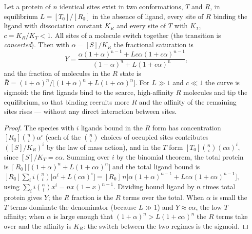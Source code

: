 \begin{theorem}\label{thm:b3:structural-biology:mwc}
Let a protein of $n$ identical sites exist in two conformations,
$T$ and $R$, in equilibrium $L = [T_{0}]/[R_{0}]$ in the absence of
ligand, every site of $R$ binding the ligand with dissociation constant
$K_{R}$ and every site of $T$ with $K_{T}$, $c = K_{R}/K_{T} < 1$. All
sites of a molecule switch together (the transition is
\emph{concerted}). Then with $\alpha = [S]/K_{R}$ the fractional
saturation is
\[
Y = \frac{\alpha(1+\alpha)^{n-1} + Lc\alpha(1+c\alpha)^{n-1}}
{(1+\alpha)^{n} + L(1+c\alpha)^{n}},
\]
and the fraction of molecules in the $R$ state is $\bar R =
(1+\alpha)^{n}/\bigl[(1+\alpha)^{n} + L(1+c\alpha)^{n}\bigr]$. For $L
\gg 1$ and $c \ll 1$ the curve is sigmoid: the first ligands bind to the
scarce, high-affinity $R$ molecules and tip the equilibrium, so that
binding recruits more $R$ and the affinity of the remaining sites
rises ---  without any direct interaction between sites.
\end{theorem}
\begin{proof}
The species with $i$ ligands bound in the $R$ form has concentration
$[R_{0}]\binom{n}{i}\alpha^{i}$ (each of the $\binom{n}{i}$ choices of
occupied sites contributes $([S]/K_{R})^{i}$ by the law of mass
action), and in the $T$ form $[T_{0}]\binom{n}{i}(c\alpha)^{i}$, since
$[S]/K_{T} = c\alpha$. Summing over $i$ by the binomial theorem, the
total protein is $[R_{0}]\bigl[(1+\alpha)^{n} + L(1+c\alpha)^{n}\bigr]$
and the total ligand bound is $[R_{0}]\sum_{i} i\binom{n}{i}\bigl[
\alpha^{i} + L(c\alpha)^{i}\bigr] = [R_{0}]\,n\bigl[\alpha(1+\alpha)^{n-1}
+ Lc\alpha(1+c\alpha)^{n-1}\bigr]$, using $\sum_{i} i\binom{n}{i}x^{i} =
nx(1+x)^{n-1}$. Dividing bound ligand by $n$ times total protein gives
$Y$; the $R$ fraction is the $R$ terms over the total. When $\alpha$ is
small the $T$ terms dominate the denominator (because $L \gg 1$) and
$Y \approx c\alpha$, the low $T$ affinity; when $\alpha$ is large enough
that $(1+\alpha)^{n} > L(1+c\alpha)^{n}$ the $R$ terms take over and the
affinity is $K_{R}$: the switch between the two regimes is the sigmoid.
\end{proof}

